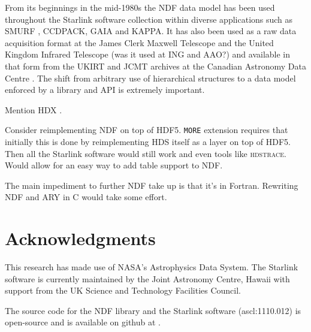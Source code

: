 \documentclass[final,authoryear,5p,times,twocolumn]{elsarticle}
\begin{document}
{From its beginnings in the mid-1980s the NDF data model has been used
throughout the Starlink software collection within diverse
applications such as SMURF \citep{2013MNRAS.430.2545C}, CCDPACK, GAIA
and KAPPA. It has also been used as a raw data acquisition format at the
James Clerk Maxwell Telescope and the United Kingdom Infrared
Telescope (was it used at ING and AAO?) and available in that form
from the UKIRT and JCMT archives at the Canadian Astronomy Data Centre
\citep{2008ASPC..394..450E,P01_adassxxiii}. The shift from arbitrary
use of hierarchical structures to a data model enforced by a library
and API is extremely important.

{\color{red} Mention HDX \citep{2003ASPC..295..221G}.}

Consider reimplementing NDF on top of HDF5. \texttt{MORE} extension
requires that initially this is done by reimplementing HDS itself as a
layer on top of HDF5. Then all the Starlink software would still work
and even tools like \textsc{hdstrace}. Would allow for an easy way to
add table support to NDF.

The main impediment to further NDF take up is that it's in
Fortran. Rewriting NDF and ARY in C would take some effort.

\section{Acknowledgments}

This research has made use of NASA's Astrophysics Data System.
The Starlink software is currently maintained by the Joint Astronomy
Centre, Hawaii with support from the UK Science and Technology
Facilities Council.

The source code for the NDF library and the Starlink software
(ascl:1110.012) is open-source and is available on github at
.



}
\end{document}

